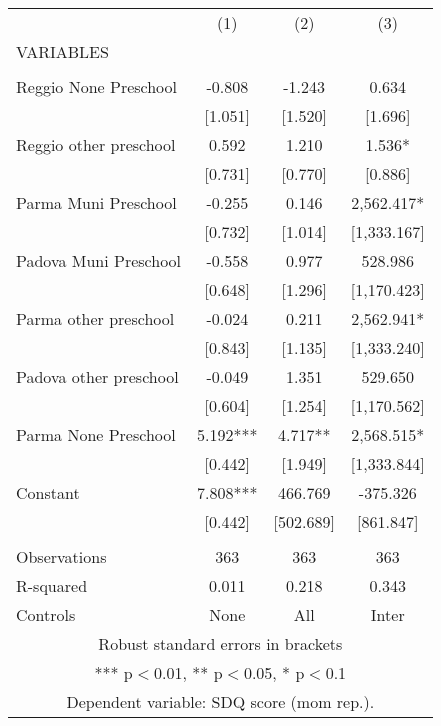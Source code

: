 \begin{tabular}{lccc} \hline
 & (1) & (2) & (3) \\
VARIABLES &  &  &  \\ \hline
 &  &  &  \\
Reggio None Preschool & -0.808 & -1.243 & 0.634 \\
 & [1.051] & [1.520] & [1.696] \\
Reggio other preschool & 0.592 & 1.210 & 1.536* \\
 & [0.731] & [0.770] & [0.886] \\
Parma Muni Preschool & -0.255 & 0.146 & 2,562.417* \\
 & [0.732] & [1.014] & [1,333.167] \\
Padova Muni Preschool & -0.558 & 0.977 & 528.986 \\
 & [0.648] & [1.296] & [1,170.423] \\
Parma other preschool & -0.024 & 0.211 & 2,562.941* \\
 & [0.843] & [1.135] & [1,333.240] \\
Padova other preschool & -0.049 & 1.351 & 529.650 \\
 & [0.604] & [1.254] & [1,170.562] \\
Parma None Preschool & 5.192*** & 4.717** & 2,568.515* \\
 & [0.442] & [1.949] & [1,333.844] \\
Constant & 7.808*** & 466.769 & -375.326 \\
 & [0.442] & [502.689] & [861.847] \\
 &  &  &  \\
Observations & 363 & 363 & 363 \\
R-squared & 0.011 & 0.218 & 0.343 \\
 Controls & None & All & Inter \\ \hline
\multicolumn{4}{c}{ Robust standard errors in brackets} \\
\multicolumn{4}{c}{ *** p$<$0.01, ** p$<$0.05, * p$<$0.1} \\
\multicolumn{4}{c}{ Dependent variable: SDQ score (mom rep.).} \\
\end{tabular}
